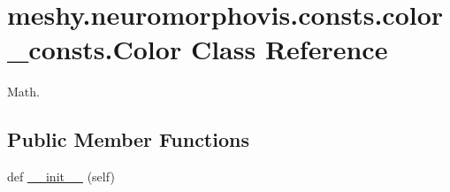 \hypertarget{classmeshy_1_1neuromorphovis_1_1consts_1_1color__consts_1_1Color}{}\section{meshy.\+neuromorphovis.\+consts.\+color\+\_\+consts.\+Color Class Reference}
\label{classmeshy_1_1neuromorphovis_1_1consts_1_1color__consts_1_1Color}


Math.  


\subsection*{Public Member Functions}
\begin{DoxyCompactItemize}
\item 
def \hyperlink{classmeshy_1_1neuromorphovis_1_1consts_1_1color__consts_1_1Color_a795b740554f34a8b8c8b2ff83b4f670b}{\+\_\+\+\_\+init\+\_\+\+\_\+} (self)\hypertarget{classmeshy_1_1neuromorphovis_1_1consts_1_1color__consts_1_1Color_a795b740554f34a8b8c8b2ff83b4f670b}{}\label{classmeshy_1_1neuromorphovis_1_1consts_1_1color__consts_1_1Color_a795b740554f34a8b8c8b2ff83b4f670b}

\end{DoxyCompactItemize}
